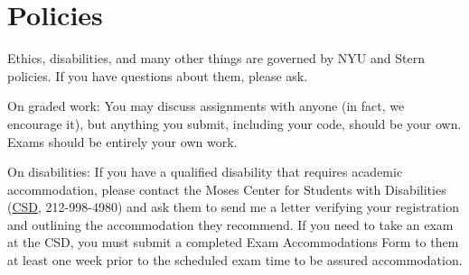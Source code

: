 \documentclass[11pt]{article}
\begin{document}
\section*{Policies}

Ethics, disabilities, and many other things are governed by NYU
and Stern policies.
If you have questions about them, please ask.

On graded work:
You may discuss assignments with anyone (in fact, we encourage it),
but anything you submit, including your code, should be your own.
Exams should be entirely your own work.

On disabilities:
If you have a qualified disability that requires academic accommodation,
please contact the Moses Center for Students with Disabilities
(\href{http://www.nyu.edu/life/safety-health-wellness/students-with-disabilities.html}{CSD},
212-998-4980) and ask them to
send me a letter verifying your registration and outlining the accommodation they recommend.
If you need to take an exam at the CSD,
you must submit a completed Exam Accommodations Form to them
at least one week prior to the scheduled exam time to be assured accommodation.



\end{document}
